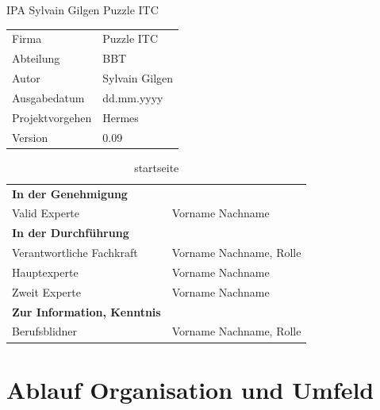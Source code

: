 \documentclass{report}
\author{Sylvain}
\begin{document}
\begin{titlepage}
  \Huge IPA Sylvain Gilgen Puzzle ITC\normalsize
\bigbreak
  \begin{tabular}{|R{0.2\textwidth}|L{0.7\textwidth}|}
    \hline
      \\[12pt]
    \hline
    Firma & Puzzle ITC \\
    \hline
    Abteilung & BBT \\
    \hline
    Autor & Sylvain Gilgen \\
    \hline
    Ausgabedatum & dd.mm.yyyy \\
    \hline
    Projektvorgehen & Hermes \\
    \hline
    Version & 0.09 \\
    \hline
  \end{tabular}
  \newline \bigbreak
  \begin{table}
    \caption{startseite}
  \begin{tabular}{|L{0.4\textwidth}|L{0.5\textwidth}|}
    \hline
      \\[12pt]
    \hline
    \textbf{In der Genehmigung} & \\
    \hline
    Valid Experte & Vorname Nachname \\
    \hline
    \textbf{In der Durchführung} & \\
    \hline
    Verantwortliche Fachkraft & Vorname Nachname, Rolle \\
    \hline
    Hauptexperte & Vorname Nachname \\
    \hline
    Zweit Experte & Vorname Nachname \\
    \hline
    \textbf{Zur Information, Kenntnis} & \\
    \hline
    Berufsblidner & Vorname Nachname, Rolle \\
    \hline
  \end{tabular}
\end{table}
\end{titlepage}

\tableofcontents

\part{Ablauf Organisation und Umfeld}
\end{document}
